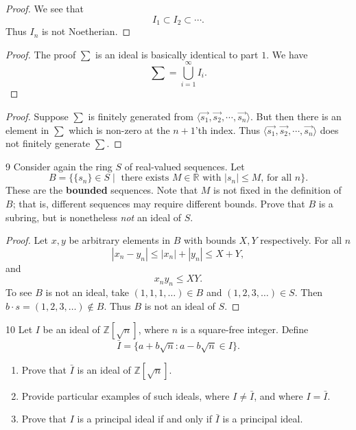 \begin{proof}
    We see that 
    \[I_1 \subset I_2 \subset \cdots.\]
    Thus $I_n$ is not Noetherian.
\end{proof}

\begin{proof}
    The proof $\sum$ is an ideal is basically identical to part $1$.
    We have 
    \[\sum = \bigcup_{i = 1}^{\infty} I_i.\]
\end{proof}

\begin{proof}
    Suppose $\sum$ is finitely generated from $\langle \vec{s_1}, \vec{s_2}, \cdots, \vec{s_n} \rangle$.
    But then there is an element in $\sum$
        which is non-zero at the  $n + 1$'th index.
    Thus $\langle \vec{s_1}, \vec{s_2}, \cdots, \vec{s_n} \rangle$ does not finitely generate $\sum$.
\end{proof}

\begin{problem}{9}
    Consider again the ring $S$ of real-valued sequences. Let 
    \[B = \{\{s_n\} \in S \mid \text{ there exists $M \in \mathbb{R}$ with $|s_n| \le M$, for all $n$}\}.\]
    These are the \textbf{bounded} sequences.
    Note that $M$ is not fixed in the definition of   $B$; that is,
        different sequences may require different bounds.
        Prove that $B$ is a subring, but is nonetheless \emph{not} an ideal of $S$.
\end{problem}
\solved

\begin{proof}
    Let $x, y$ be arbitrary elements in $B$ with bounds $X, Y$ respectively.
    For all $n$
    \[|x_n - y_n| \le |x_n| + |y_n| \le X + Y,\]
    and 
    \[x_n y_n \le XY.\]
    To see $B$ is not an ideal, take $(1, 1, 1, \ldots) \in B$
        and $(1, 2, 3, \dots) \in S$.
    Then $b \cdot s = (1, 2, 3, \dots) \notin B$.
    Thus $B$ is not an ideal of $S$.
\end{proof}

\begin{problem}{10}
    Let $I$ be an ideal of $\mathbb{Z}[\sqrt{n}]$, where $n$ is a square-free integer.
    Define
    \[\bar{I} = \{a + b\sqrt{n} : a - b\sqrt{n} \in I\}.\]
    \begin{enumerate}
        \item[(a)] Prove that $\bar{I}$ is an ideal of $\mathbb{Z}[\sqrt{n}]$.
        \item[(b)] Provide particular examples of such ideals, where $I \neq \bar{I}$, and
        where $I = \bar{I}$.
        \item[(c)] Prove that $I$ is a principal ideal if and only if $\bar{I}$ is a
        principal ideal.
    \end{enumerate}
\end{problem}
\unsolved

